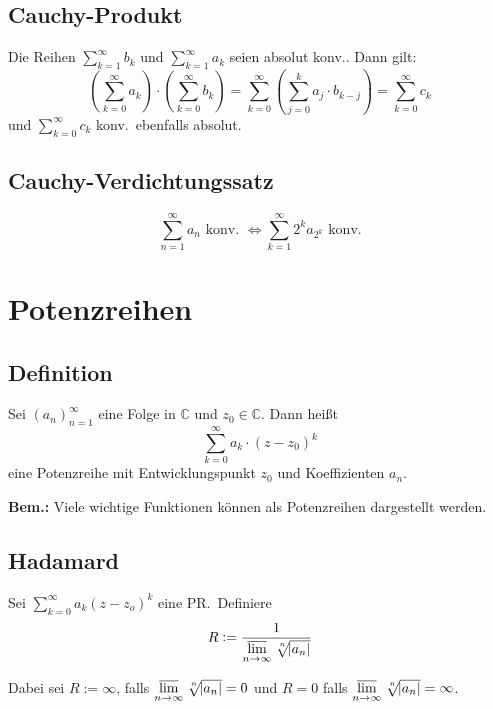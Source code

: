 \documentclass[10pt]{article}
\newcommand{\C}{\mathbb{C}}
\newcommand{\an}{{(a_n)}_{n=1}^\infty}
\newcommand*{\nthSqrt}[2]{\sqrt[\leftroot{-2}\uproot{2}#1]{#2}}
\begin{document}
    \subsection{Cauchy-Produkt}
    Die Reihen  $\sum_{k=1}^\infty b_k$ und $\sum_{k=1}^\infty a_k$ seien absolut
    konv.. Dann gilt:
    \begin{equation*}
        \left(\sum_{k=0}^\infty a_k\right) \cdot \left(\sum_{k=0}^\infty b_k\right) =
        \sum_{k=0}^\infty \left(\sum_{j=0}^k a_j \cdot b_{k-j}\right) =
        \sum_{k=0}^\infty c_k
    \end{equation*}
    und $\sum_{k=0}^\infty c_k$ konv.\ ebenfalls absolut.

    \subsection{Cauchy-Verdichtungssatz}
    \begin{equation*}
        \sum_{n=1}^\infty a_n \text{ konv. } \Leftrightarrow
        \sum_{k=1}^\infty 2^k a_{2^k} \text{ konv.}
    \end{equation*}


    \section{Potenzreihen}

    \subsection{Definition}
    Sei $\an$ eine Folge in $\C$ und $z_0 \in \C$. Dann heißt
    \begin{equation*}
        \sum_{k=0}^\infty a_k \cdot {(z - z_0)}^k
    \end{equation*}
    eine Potenzreihe mit Entwicklungspunkt $z_0$ und Koeffizienten
    $a_n$.

    \textbf{Bem.:} Viele wichtige Funktionen können als Potenzreihen dargestellt
    werden.

    \subsection{Hadamard}
    Sei $\sum_{k=0}^\infty a_k {(z-z_o)}^k$ eine PR.\ Definiere
    \begin{equation*}
        R := \frac{1}{\varlimsup\limits_{n \rightarrow \infty} \nthSqrt{n}{\abs{a_n}}}
    \end{equation*}

    Dabei sei $R:=\infty$, falls
    $\varlimsup\limits_{n \rightarrow \infty} \nthSqrt{n}{\abs{a_n}} = 0$ und
    $R=0$ falls
    $\varlimsup\limits_{n \rightarrow \infty} \nthSqrt{n}{\abs{a_n}} = \infty$.
\end{document}
